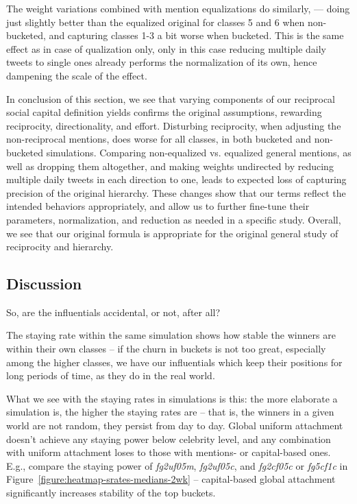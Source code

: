 \documentclass[10pt,oneside]{memoir}
\begin{document}
\begin{Spacing}{2}
The weight variations combined with mention equalizations do similarly, --- doing just slightly better than the equalized original for classes 5 and 6 when non-bucketed, and capturing classes 1-3 a bit worse when bucketed.  This is the same effect as in case of qualization only, only in this case reducing multiple daily tweets to single ones already performs the normalization of its own, hence dampening the scale of the effect.


In conclusion of this section, we see that varying components of our reciprocal social capital definition yields confirms the original assumptions, rewarding reciprocity, directionality, and effort.  Disturbing reciprocity, when adjusting the non-reciprocal mentions, does worse for all classes, in both bucketed and non-bucketed simulations.  Comparing non-equalized vs. equalized general mentions, as well as dropping them altogether, and making weights undirected by reducing multiple daily tweets in each direction to one, leads to expected loss of capturing precision of the original hierarchy.  These changes show that our terms reflect the intended behaviors appropriately, and allow us to further fine-tune their parameters, normalization, and reduction as needed in a specific study.  Overall, we see that our original formula is appropriate for the original general study of reciprocity and hierarchy.






\pagebreak \subsection{Discussion}
\label{discussion}

\label{section:discussion}
So, are the influentials accidental, or not, after all?


The staying rate within the same simulation shows how stable the winners are within their own classes -- if the churn in buckets is not too great, especially among the higher classes, we have our influentials which keep their positions for long periods of time, as they do in the real world.


What we see with the staying rates in simulations is this: the more elaborate a simulation is, the higher the staying rates are -- that is, the winners in a given world are not random, they persist from day to day.  Global uniform attachment doesn't achieve any staying power below celebrity level, and any combination with uniform attachment loses to those with mentions- or capital-based ones.  E.g., compare the staying power of {\itshape fg2uf05m}, {\itshape fg2uf05c}, and {\itshape fg2cf05c} or {\itshape fg5cf1c} in Figure~\ref{figure:heatmap-srates-medians-2wk} -- capital-based global attachment significantly increases stability of the top buckets.



\end{Spacing}
\end{document}
